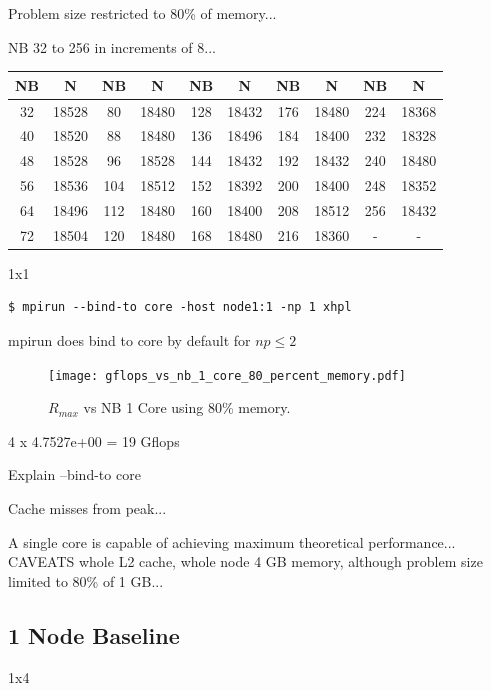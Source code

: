 \documentclass{report}
\begin{document}
Problem size restricted to 80\% of memory...

NB 32 to 256 in increments of 8...

\begin{center}
	\begin{tabular}{ |c|c|c|c|c|c|c|c|c|c| } 
		\hline
		NB & N & NB & N & NB & N & NB & N & NB & N \\ 
		\hline
		32 & 18528 &  80 & 18480 & 128 & 18432 & 176 & 18480 & 224 & 18368 \\ 
		40 & 18520 &  88 & 18480 & 136 & 18496 & 184 & 18400 & 232 & 18328 \\ 
 		48 & 18528 &  96 & 18528 & 144 & 18432 & 192 & 18432 & 240 & 18480 \\
		56 & 18536 & 104 & 18512 & 152 & 18392 & 200 & 18400 & 248 & 18352 \\ 
 		64 & 18496 & 112 & 18480 & 160 & 18400 & 208 & 18512 & 256 & 18432 \\
		72 & 18504 & 120 & 18480 & 168 & 18480 & 216 & 18360 &   - &     - \\ 
 		\hline
	\end{tabular}
\end{center}

1x1

\lstset{style=termstyle}
\begin{lstlisting}[]
$ mpirun --bind-to core -host node1:1 -np 1 xhpl
\end{lstlisting}

mpirun does bind to core by default for $np \leq 2$

\begin{figure}
	\centering	
	\texttt{[image: gflops\_vs\_nb\_1\_core\_80\_percent\_memory.pdf]}
	\caption{$R_{max}$ vs NB 1 Core using 80\% memory.}
\end{figure}

4 x 4.7527e+00 = 19 Gflops

Explain --bind-to core

Cache misses from peak...

A single core is capable of achieving maximum theoretical performance... CAVEATS whole L2 cache, whole node 4 GB memory, although problem size limited to 80\% of 1 GB...  


\subsection{1 Node Baseline}

1x4
\end{document}
